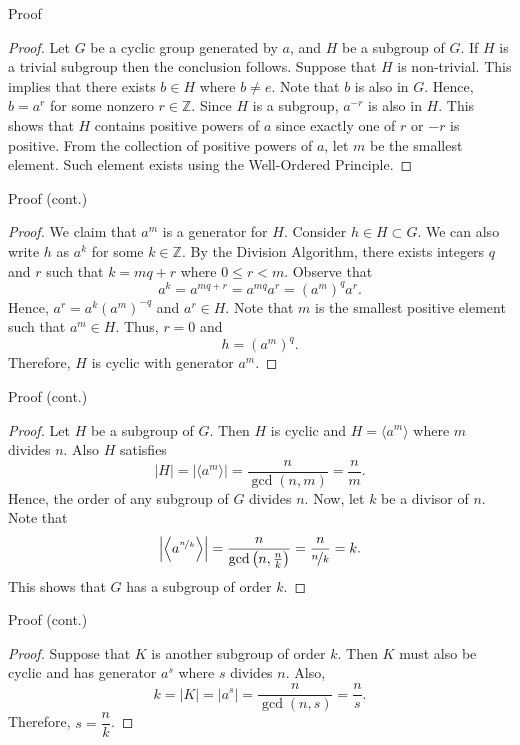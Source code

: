 \documentclass{beamer}
\begin{document}
\begin{frame}{Proof}
\begin{proof}
\renewcommand{\qedsymbol}{}
\justifying
Let $G$ be a cyclic group generated by $a$, and $H$ be a subgroup of $G$. If $H$ is a trivial subgroup then the conclusion follows. Suppose that $H$ is non-trivial. This implies that there exists $b \in H$ where $b \neq e$. Note that $b$ is also in $G$. Hence, $b = a^r$ for some nonzero $r \in \mathbb{Z}$. Since $H$ is a subgroup, $a^{-r}$ is also in $H$. This shows that $H$ contains positive powers of $a$ since exactly one of $r$ or $-r$ is positive. From the collection of positive powers of $a$, let $m$ be the smallest element. Such element exists using the Well-Ordered Principle.
\end{proof}
\end{frame}

\begin{frame}{Proof (cont.)}
\begin{proof}
\renewcommand{\qedsymbol}{}
\justifying
We claim that $a^m$ is a generator for $H$. Consider $h \in H \subset G$. We can also write $h$ as $a^k$ for some $k \in \mathbb{Z}$. By the Division Algorithm, there exists integers $q$ and $r$ such that $k = mq + r$ where $0 \leq r < m$. Observe that
\[
a^k = a^{mq + r} = a^{mq}a^r = \left(a^m\right)^qa^r.
\]
Hence, $a^r = a^k\left(a^m\right)^{-q}$ and $a^r \in H$. Note that $m$ is the smallest positive element such that $a^m \in H$. Thus, $r = 0$ and
\[
h = \left(a^m\right)^q.
\]
Therefore, $H$ is cyclic with generator $a^m$.
\end{proof}    
\end{frame}

\begin{frame}{Proof (cont.)}
\begin{proof}
\renewcommand{\qedsymbol}{}
\justifying
Let $H$ be a subgroup of $G$. Then $H$ is cyclic and $H = \langle a^m\rangle$ where $m$ divides $n$. Also $H$ satisfies 
\[
|H| = \left|\langle a^m\rangle\right| = \dfrac{n}{\gcd(n, m)} = \dfrac{n}{m}. 
\]
Hence, the order of any subgroup of $G$ divides $n$. Now, let $k$ be a divisor of $n$. Note that 
\[
\left|\left\langle a^{\nicefrac{n}{k}}\right\rangle\right| = \dfrac{n}{\gcd\left(n, \frac{n}{k}\right)} = \dfrac{n}{\nicefrac{n}{k}} = k.
\]
This shows that $G$ has a subgroup of order $k$. 
\end{proof}    
\end{frame}

\begin{frame}{Proof (cont.)}
\begin{proof}
\justifying
Suppose that $K$ is another subgroup of order $k$. Then $K$ must also be cyclic and has generator $a^s$ where $s$ divides $n$. Also, 
\[
k = |K| = |a^s| = \dfrac{n}{\gcd(n, s)} = \dfrac{n}{s}.
\]
Therefore, $s = \dfrac{n}{k}$.
\end{proof}    
\end{frame}
\end{document}

